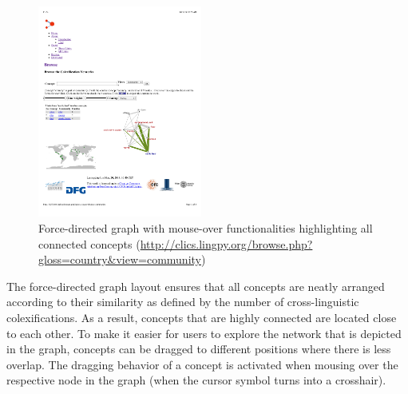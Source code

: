 \begin{figure}[htbp]
\begin{center}
\includegraphics[width=0.48\textwidth]{img/earthland.pdf}
\caption{Force-directed graph with mouse-over functionalities highlighting all connected concepts (\url{http://clics.lingpy.org/browse.php?gloss=country&view=community})}
\label{EarthLand}
\end{center}
\end{figure}

The force-directed graph layout ensures that all concepts are neatly arranged according to their similarity as defined by the number of cross-linguistic colexifications. As a result, concepts that are highly connected are located close to each other.  To make it easier for users to explore the network that is depicted in the graph, concepts can be dragged to different positions where there is less overlap. The dragging behavior of a concept  is activated when mousing over the respective node in the graph (when the cursor symbol turns into a crosshair).

